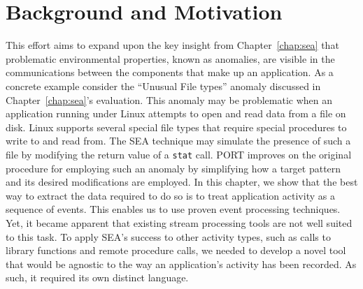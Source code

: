 \section{Background and Motivation}
\label{sec:PORTbackground}


This effort aims to
expand upon the key insight from
Chapter~\ref{chap:sea}
that problematic
environmental properties,
known as anomalies, are visible in the
communications between the components that make up an application.
As a concrete example
consider the ``Unusual File types'' anomaly
discussed in Chapter~\ref{chap:sea}'s evaluation.
This anomaly may be problematic
when an application running under Linux
attempts to open and read data from a file on disk.
Linux supports several special file types  that require special procedures to
write to and
read from.
The SEA technique
may simulate the presence of such a file by
modifying
the return value
of a {\tt stat} call.
PORT improves on the original procedure for employing such an anomaly
by simplifying how a target pattern
and its desired modifications are employed.
In this chapter, we
show that the best way to extract the data required to do so
is to treat application activity
as a sequence of events. This enables us to use
proven event processing techniques.
Yet, it became apparent that existing
stream processing tools
are not well suited to this task. To apply
SEA's success to other activity types,
such as calls to library functions
and remote procedure calls, we needed to develop a novel tool that would be  agnostic to the way an application's activity has been recorded. As such, it required its own  distinct language.



